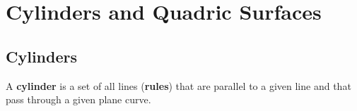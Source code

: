 \documentclass[../Calculus_\Roman{3}]{subfiles}
\begin{document}
				\section{Cylinders and Quadric Surfaces}
					\subsection*{Cylinders}
							A \textbf{cylinder} is a set of all lines (\textbf{rules}) that are parallel to a given line and that pass through a given plane curve. \\
							
\end{document}
